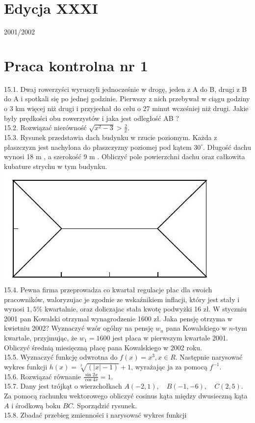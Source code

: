 \documentclass[10pt]{article}
\begin{document}
\section*{Edycja XXXI}
2001/2002

\section*{Praca kontrolna nr 1}
15.1. Dwaj rowerzyści wyruszyli jednocześnie w drogę, jeden z A do B, drugi z B do A i spotkali się po jednej godzinie. Pierwszy z nich przebywał w ciągu godziny o 3 km więcej niż drugi i przyjechał do celu o 27 minut wcześniej niż drugi. Jakie były prędkości obu rowerzystów i jaka jest odległość AB ?\\
15.2. Rozwiązać nierówność $\sqrt{x^{2}-3}>\frac{2}{x}$.\\
15.3. Rysunek przedstawia dach budynku w rzucie poziomym. Każda z płaszczyzn jest nachylona do płaszczyzny poziomej pod kątem $30^{\circ}$. Długość dachu wynosi 18 m , a szerokość 9 m . Obliczyć pole powierzchni dachu oraz całkowita kubature strychu w tym budynku.\\
\includegraphics[max width=\textwidth, center]{2024_11_16_fe5b564401bf7db98894g-022}\\
15.4. Pewna firma przeprowadza co kwartał regulacje płac dla swoich pracowników, waloryzujac je zgodnie ze wskaźnikiem inflacji, który jest stały i wynosi $1,5 \%$ kwartalnie, oraz doliczajac stała kwotę podwyżki 16 zł. W styczniu 2001 pan Kowalski otrzymal wynagrodzenie 1600 zł. Jaka pensję otrzyma w kwietniu 2002? Wyznaczyć wzór ogólny na pensję $w_{n}$ pana Kowalskiego w $n$-tym kwartale, przyjmując, że $w_{1}=1600$ jest płaca w pierwszym kwartale 2001. Obliczyć średnią miesięczną płacę pana Kowalskiego w 2002 roku.\\
15.5. Wyznaczyć funkcję odwrotna do $f(x)=x^{3}, x \in R$. Następnie narysować wykres funkcji $h(x)=\sqrt[3]{(|x|-1)}+1$, wyrażając ja za pomocą $f^{-1}$.\\
15.6. Rozwiązać równanie $\frac{\sin 2 x}{\cos 4 x}=1$.\\
15.7. Dany jest trójkąt o wierzchołkach $A(-2,1), \quad B(-1,-6), \quad C(2,5)$. Za pomocą rachunku wektorowego obliczyć cosinus kąta między dwusieczną kąta $A$ i środkową boku $B C$. Sporządzić rysunek.\\
15.8. Zbadać przebieg zmienności i narysować wykres funkcji
\end{document}
